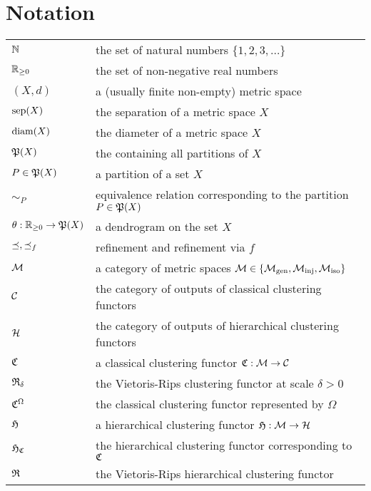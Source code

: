 \chapter{Notation}
\begin{tabular}{ll}
$\N$ & the set of natural numbers $\{1, 2, 3, \dots \}$\\
$\R_{\geq0}$ & the set of non-negative real numbers\\

$(X,d)$ & a (usually finite non-empty) metric space\\
$\sep(X)$ & the separation of a metric space $X$\\
$\diam(X)$ & the diameter of a metric space $X$\\

$\P(X)$ & the containing all partitions of $X$\\
$P \in \P(X)$ & a partition of a set $X$\\
$\sim_P$ & equivalence relation corresponding to the partition $P \in \P(X)$\\

$\theta: \R_{\geq0} \to \P(X)$ & a dendrogram on the set $X$\\

$\refines, \refines_f$ & refinement and refinement via $f$\\

$\M$ & a category of metric spaces $\M \in \{\gen, \inj, \iso\}$\\
$\C$ & the category of outputs of classical clustering functors\\
$\H$ & the category of outputs of hierarchical clustering functors\\

$\Cf$ & a classical clustering functor $\Cf: \M \to \C$\\
$\Rf_\delta$ & the Vietoris-Rips clustering functor at scale $\delta>0$\\
$\Cf^\Omega$ & the classical clustering functor represented by $\Omega$\\

$\Hf$ & a hierarchical clustering functor $\Hf: \M \to \H$\\
$\Hf_\Cf$ & the hierarchical clustering functor corresponding to $\Cf$\\
$\Rf$ & the Vietoris-Rips hierarchical clustering functor\\

\end{tabular}